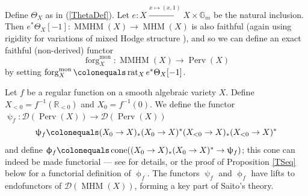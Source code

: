 \documentclass[a4paper,10pt]{amsart}
\renewcommand{\phi}{\upphi}
\renewcommand{\psi}{\uppsi}
\DeclareMathOperator{\mon}{mon}
\DeclareMathOperator{\MMHM}{MMHM}
\DeclareMathOperator{\rat}{rat}
\DeclareMathOperator{\perv}{Perv}
\DeclareMathOperator{\MHM}{MHM}
\DeclareMathOperator{\cone}{cone}
\DeclareMathOperator{\forg}{forg}
\newcommand{\form}[1]{\forg^{\mon}_{#1}}
\newcommand{\Dub}{\mathcal{D}}
\begin{document}
Define $\Theta_X$ as in (\ref{ThetaDef}).  Let $e\colon X\xrightarrow{x\mapsto(x,1)}X\times\mathbb{G}_m$ be the natural inclusion.  Then $e^*\Theta_X[-1]\colon \MMHM(X)\rightarrow \MHM(X)$ is also faithful (again using rigidity for variations of mixed Hodge structure \cite[Thm.4.20]{StZu85}), and so we can define an exact faithful (non-derived) functor
\begin{equation}
\label{formDef}
\form{X}\colon \MMHM(X)\rightarrow \perv(X)
\end{equation}
by setting $\form{X}\colonequals \rat_Xe^*\Theta_X[-1]$.  
\smallbreak



Let $f$ be a regular function on a smooth algebraic variety $X$.  Define $X_{<0}=f^{-1}(\mathbb{R}_{<0})$ and $X_0=f^{-1}(0)$.  We define the functor $\psi_f\colon \Dub(\perv(X))\rightarrow\Dub(\perv(X))$
\[
\psi_f\colonequals (X_0\rightarrow X)_*(X_0\rightarrow X)^*(X_{<0}\rightarrow X)_*(X_{<0}\rightarrow X)^*
\]
and define $\phi_f\colonequals \cone((X_0\rightarrow X)_*(X_0\rightarrow X)^*\rightarrow\psi_f)$; this cone can indeed be made functorial --- see \cite{KSsheaves} for details, or the proof of Proposition \ref{TSeq} below for a functorial definition of $\phi_f$.  The functors $\psi_f$ and $\phi_f$ have lifts to endofunctors of $\Dub(\MHM(X))$, forming a key part of Saito's theory.  

\end{document}
